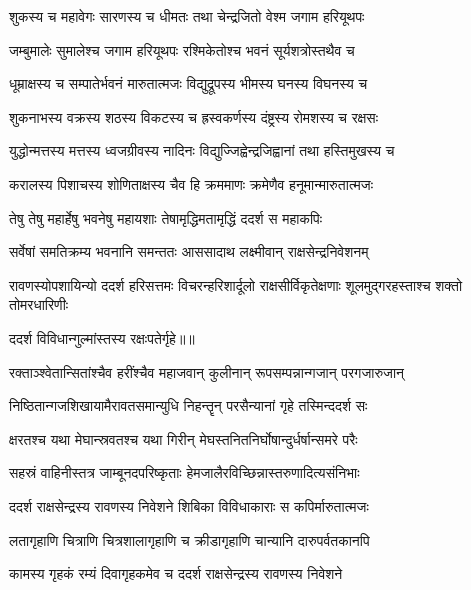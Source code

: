 \twolineshloka
{शुकस्य च महावेगः सारणस्य च धीमतः}
{तथा चेन्द्रजितो वेश्म जगाम हरियूथपः} %

\twolineshloka
{जम्बुमालेः सुमालेश्च जगाम हरियूथपः}
{रश्मिकेतोश्च भवनं सूर्यशत्रोस्तथैव च} %

\twolineshloka
{धूम्राक्षस्य च सम्पातेर्भवनं मारुतात्मजः}
{विद्युद्रूपस्य भीमस्य घनस्य विघनस्य च} %

\twolineshloka
{शुकनाभस्य वक्रस्य शठस्य विकटस्य च}
{ह्रस्वकर्णस्य दंष्ट्रस्य रोमशस्य च रक्षसः} %

\twolineshloka
{युद्धोन्मत्तस्य मत्तस्य ध्वजग्रीवस्य नादिनः}
{विद्युज्जिह्वेन्द्रजिह्वानां तथा हस्तिमुखस्य च} %

\twolineshloka
{करालस्य पिशाचस्य शोणिताक्षस्य चैव हि}
{क्रममाणः क्रमेणैव हनूमान्मारुतात्मजः} %

\twolineshloka
{तेषु तेषु महार्हेषु भवनेषु महायशाः}
{तेषामृद्धिमतामृद्धिं ददर्श स महाकपिः} %

\twolineshloka
{सर्वेषां समतिक्रम्य भवनानि समन्ततः}
{आससादाथ लक्ष्मीवान् राक्षसेन्द्रनिवेशनम्} %

\threelineshloka
{रावणस्योपशायिन्यो ददर्श हरिसत्तमः}
{विचरन्हरिशार्दूलो राक्षसीर्विकृतेक्षणाः}
{शूलमुद्गरहस्ताश्च शक्तो तोमरधारिणीः} %

{ददर्श विविधान्गुल्मांस्तस्य रक्षःपतेर्गृहे॥॥} %

\addtocounter{shlokacount}{1}

\twolineshloka
{रक्ताञ्श्वेतान्सितांश्चैव हरींश्चैव महाजवान्}
{कुलीनान् रूपसम्पन्नान्गजान् परगजारुजान्} %

\twolineshloka
{निष्ठितान्गजशिखायामैरावतसमान्युधि}
{निहन्तॄन् परसैन्यानां गृहे तस्मिन्ददर्श सः} %

\twolineshloka
{क्षरतश्च यथा मेघान्स्रवतश्च यथा गिरीन्}
{मेघस्तनितनिर्घोषान्दुर्धर्षान्समरे परैः} %

\twolineshloka
{सहस्रं वाहिनीस्तत्र जाम्बूनदपरिष्कृताः}
{हेमजालैरविच्छिन्नास्तरुणादित्यसंनिभाः} %

\twolineshloka
{ददर्श राक्षसेन्द्रस्य रावणस्य निवेशने}
{शिबिका विविधाकाराः स कपिर्मारुतात्मजः} %

\twolineshloka
{लतागृहाणि चित्राणि चित्रशालागृहाणि च}
{क्रीडागृहाणि चान्यानि दारुपर्वतकानपि} %

\twolineshloka
{कामस्य गृहकं रम्यं दिवागृहकमेव च}
{ददर्श राक्षसेन्द्रस्य रावणस्य निवेशने} %

